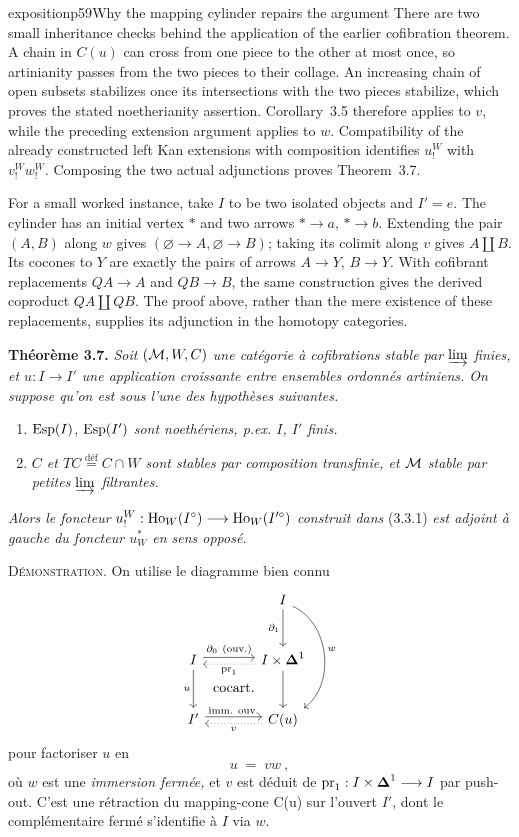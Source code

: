 \begin{dcomment}{exposition}{p59}{Why the mapping cylinder repairs the argument}
There are two small inheritance checks behind the application of the earlier cofibration theorem. A chain in $C(u)$ can cross from one piece to the other at most once, so artinianity passes from the two pieces to their collage. An increasing chain of open subsets stabilizes once its intersections with the two pieces stabilize, which proves the stated noetherianity assertion. Corollary~3.5 therefore applies to $v$, while the preceding extension argument applies to $w$. Compatibility of the already constructed left Kan extensions with composition identifies $u_!^W$ with $v_!^Ww_!^W$. Composing the two actual adjunctions proves Theorem~3.7.

For a small worked instance, take $I$ to be two isolated objects and $I'=e$. The cylinder has an initial vertex $*$ and two arrows $*\to a$, $*\to b$. Extending the pair $(A,B)$ along $w$ gives $(\varnothing\to A,\varnothing\to B)$; taking its colimit along $v$ gives $A\amalg B$. Its cocones to $Y$ are exactly the pairs of arrows $A\to Y$, $B\to Y$. With cofibrant replacements $QA\to A$ and $QB\to B$, the same construction gives the derived coproduct $QA\amalg QB$. The proof above, rather than the mere existence of these replacements, supplies its adjunction in the homotopy categories.
\end{dcomment}


\textbf{Théorème 3.7.} \textit{Soit $(\mathcal{M},W,C)$ une catégorie à cofibrations stable par $\varinjlim$ finies, et $u : I \longrightarrow I'$ une application croissante entre ensembles ordonnés artiniens. On suppose qu'on est sous l'une des hypothèses suivantes.}
\begin{enumerate}
\item[a)] $\operatorname{Esp}(I)$, $\operatorname{Esp}(I')$ \textit{sont noethériens, p.ex. $I$, $I'$ finis.}

\item[b)] \textit{$C$ et $TC \overset{\text{déf}}{=} C\cap W$ sont stables par composition transfinie, et $\mathcal{M}$ stable par petites $\varinjlim$ filtrantes.}
\end{enumerate}
\textit{Alors le foncteur} $u_!^W : \operatorname{Ho}_W(I^\circ) \longrightarrow \operatorname{Ho}_W(I'^\circ)$ \textit{construit dans} (3.3.1) \textit{est adjoint à gauche du foncteur $u_W^*$ en sens opposé.}

\textsc{Démonstration.} On utilise le diagramme bien connu
\[
\begin{tikzcd}[row sep=large, column sep=large]
 & I \arrow[d, "\partial_1"'] \arrow[dd, bend left=60, "w"] \\
I \arrow[r, shift left, "\partial_0\ (\text{ouv.})"] \arrow[d, "u"'] \arrow[dr, phantom, "\text{cocart.}"] & I\times\boldsymbol{\Delta}^1 \arrow[l, dotted, shift left, "\pr_1"] \arrow[d] \\
I' \arrow[r, shift left, "\text{imm. ouv.}"] & C(u) \arrow[l, dotted, shift left, "v"]
\end{tikzcd}
\]
pour factoriser $u$ en
\[
u \;=\; vw\ ,
\]
où $w$ est une \textit{immersion fermée,} et $v$ est déduit de $\mathrm{pr}_1 : I\times\boldsymbol{\Delta}^1 \longrightarrow I$ par push-out. C'est une rétraction du mapping-cone C(u) sur l'ouvert $I'$, dont le complémentaire fermé s'identifie à $I$ via $w$.

